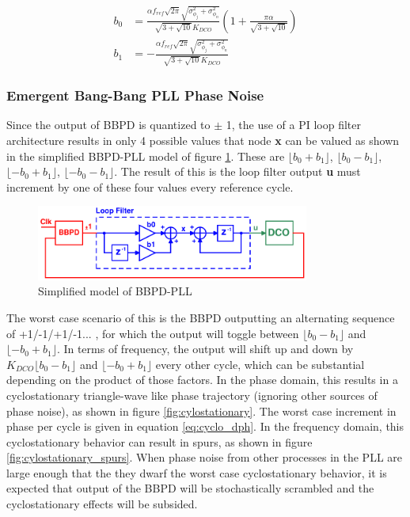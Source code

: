 			\begin{align}
				b_0 &= \frac{\alpha f_{ref}\sqrt{2\pi}\sqrt{\sigma^2_{\phi_j} + \sigma^2_{\phi_n}}}{\sqrt{3+\sqrt{10}}K_{DCO}} \left(1+\frac{\pi\alpha}{\sqrt{3+\sqrt{10}}}\right)\label{eq:b0_}\\
				 b_1 &= - \frac{\alpha f_{ref}\sqrt{2\pi}\sqrt{\sigma^2_{\phi_j} + \sigma^2_{\phi_n}}}{\sqrt{3+\sqrt{10}}K_{DCO}}\label{eq:b1_}
			\end{align}
	


			\FloatBarrier\subsubsection{Emergent Bang-Bang PLL Phase Noise}\label{sec:bb_noise}
			Since the output of BBPD is quantized to $\pm$ 1, the use of a PI loop filter architecture results in only 4 possible values that node {\color{blue}\textbf{x}} can be valued as shown in the simplified BBPD-PLL model of figure \ref{fig:simp_bbpdpll}. These are $\lfloor b_0+b_1 \rfloor$, $\lfloor b_0-b_1 \rfloor$, $\lfloor -b_0+b_1 \rfloor$, $\lfloor -b_0-b_1 \rfloor$. The result of this is the loop filter output {\color{teal}\textbf{u}} must increment by one of these four values every reference cycle. 

		\begin{figure}
			\center\includegraphics[width=0.8\textwidth, angle=0]{./figs/design/simplified_bbpll}
			\caption{Simplified model of BBPD-PLL}
			\label{fig:simp_bbpdpll}
		\end{figure}
		The worst case scenario of this is the BBPD outputting an alternating sequence of +1/-1/+1/-1... , for which the output will toggle between $\lfloor b_0-b_1 \rfloor$ and $\lfloor -b_0+b_1 \rfloor$. In terms of frequency, the output will shift up and down by $K_{DCO}\lfloor b_0-b_1 \rfloor$ and $\lfloor -b_0+b_1 \rfloor$ every other cycle, which can be substantial depending on the product of those factors. In the phase domain, this results in a cyclostationary triangle-wave like phase trajectory (ignoring other sources of phase noise), as shown in figure \ref{fig:cylostationary}. The worst case increment in phase per cycle is given in equation \ref{eq:cyclo_dph}. In the frequency domain, this cyclostationary behavior can result in spurs, as shown in figure \ref{fig:cylostationary_spurs}. When phase noise from other processes in the PLL are large enough that the they dwarf the worst case cyclostationary behavior, it is expected that output of the BBPD will be stochastically scrambled and the cyclostationary effects will be subsided. 

